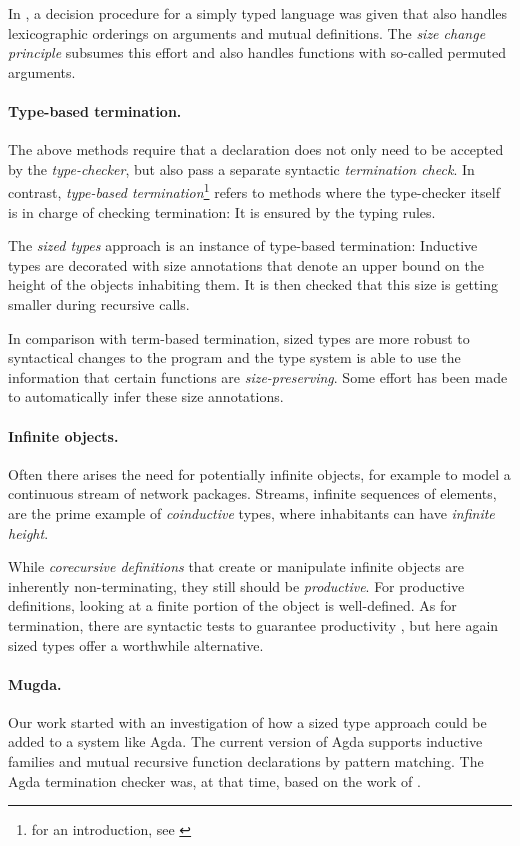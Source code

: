 In \cite{abelAltenkirch:predStRec}, a decision procedure for a simply typed language was given that also handles lexicographic orderings on arguments and mutual definitions.
The \emph{size change principle} \cite{lee01sizechange} subsumes this effort and also handles functions with so-called permuted arguments. 

\paragraph*{Type-based termination.}
The above methods require that a declaration does not only need to be accepted by the \emph{type-checker}, but also pass a separate syntactic \emph{termination check}.
In contrast, \emph{type-based termination}\footnote{for an introduction, see \cite{abel:PhD}} refers to methods where the type-checker itself is in charge of checking termination: It is ensured by the typing rules. 

The \emph{sized types} approach is an instance of type-based termination:
Inductive types are decorated with size annotations that denote an upper bound on the height of the objects inhabiting them. 
It is then checked that this size is getting smaller during recursive calls.

In comparison with term-based termination, sized types are more robust to syntactical changes to the program and the type system is able to use the information that certain functions are \emph{size-preserving}.
Some effort \cite{bgp:lpar06} has been made to automatically infer these size annotations.

\paragraph{Infinite objects.}
Often there arises the need for potentially infinite objects, for example to model a continuous stream of network packages.
Streams, infinite sequences of elements, are the prime example of \emph{coinductive} types, where inhabitants can have 
\emph{infinite height}. 

While \emph{corecursive definitions} that create or manipulate infinite objects are inherently non-terminating, they still should be \emph{productive}. For productive definitions, looking at a finite portion of the object is well-defined.
As for termination, there are syntactic tests to guarantee productivity \cite{coquand-infinite}, but here again sized types offer a worthwhile alternative.  

\paragraph*{Mugda.}
Our work started with an investigation of how a sized type approach could be added to a system like Agda.
The current version of Agda supports inductive families and mutual recursive function declarations by pattern matching. 
The Agda termination checker was, at that time, based on the work of \cite{abelAltenkirch:predStRec}.

